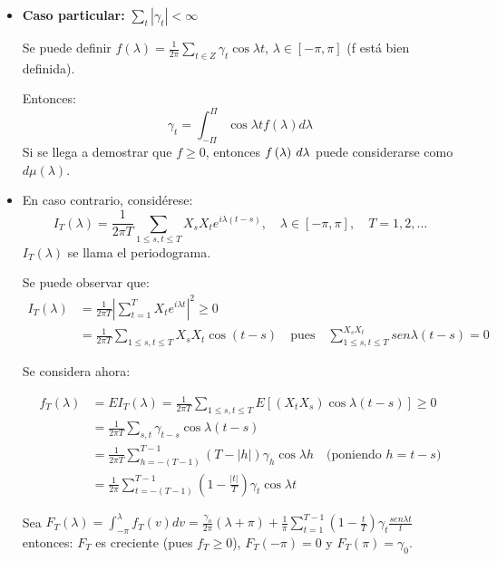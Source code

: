 \begin{itemize}
      \item \textbf{Caso particular:} $\sum\limits_t {\left| {\gamma_{t} } \right|<\infty }$\newline

Se puede definir $f\left( \lambda \right)=\frac{1}{2\pi }\sum\limits_{t\in Z} {\gamma_{t} \cos \lambda t}$, $\lambda \in \left[ {-\pi ,\pi } \right]$ (f est\'{a} bien definida).\newline

Entonces: 
\[
\gamma_{t} =\int_{-\Pi }^\Pi {\cos \lambda t} 
f\left( \lambda \right)d\lambda 
\]
Si se llega a demostrar que $f\ge 0$, entonces $f\left( \lambda \right){\kern 1pt}{\kern 1pt}d\lambda $ puede considerarse como $d\mu \left( \lambda \right)$.

      \item En caso contrario, consid\'{e}rese: 
\[
I_{T} (\lambda)=\frac{1}{2\pi T}\sum\limits_{1\le s,t\le T} {X_{s} } X_{t} e^{i\lambda (t-s)},\quad \lambda \in \left[-\pi, \pi \right], \quad T=1,2,\ldots
\]
$I_{T}(\lambda)$ se llama el periodograma.\newline

Se puede observar que:
\begin{align*}
I_{T} \left( \lambda \right) & = \frac{1}{2\pi T}\left| {\sum\limits_{t=1}^T {X_{t} e^{i\lambda t}} } \right|^{2}\ge 0\\
                             & = \frac{1}{2\pi T}\sum\limits_{1\le s,t\le T} {X_{s} X_{t} \cos ( t-s)} \quad \text{pues}\quad \sum_{1\le s,t\le T}^{X_{s} X_{t} } sen\lambda (t-s)=0
\end{align*}

Se considera ahora: 

\begin{align*}
f_{T} (\lambda) &= EI_{T} (\lambda)=\frac{1}{2\pi T}\sum\limits_{1\leq s,t\leq T} {E\left[ {\left(X_{t} X_{s} \right)\cos \lambda (t-s)} \right]\ge 0}\\
                &= \frac{1}{2\pi T}\sum\limits_{s,t} {\gamma_{t-s} } \cos \lambda \left( {t-s} \right)\\
                &= \frac{1}{2\pi T}\sum\limits_{h=-(T-1)}^{T-1} {\left(T-|h| \right)}\gamma_{h} \cos \lambda h\quad \text{(poniendo $h=t-s$)}\\
                &= \frac{1}{2\pi }\sum\limits_{t=-(T-1)}^{T-1} {\left( {1-\frac{\left| t \right|}{T}} \right)} \gamma_{t} \cos \lambda t
\end{align*}

Sea $F_{T}(\lambda)=\int_{-\pi }^\lambda {f_{T} (v)dv=\frac{\gamma_{o}}{2\pi}(\lambda +\pi)+\frac{1}{\pi}\displaystyle\sum\limits_{t=1}^{T-1} {\left( {1-\frac{t}{T}} \right)}\gamma_{t} \frac{sen\lambda t}{t}}$ entonces: $F_{T}$ es creciente (pues $f_{T} \ge 0$),  $F_{T}(-\pi)=0$ y $F_{T}(\pi)=\gamma_{0}$.

\end{itemize}

